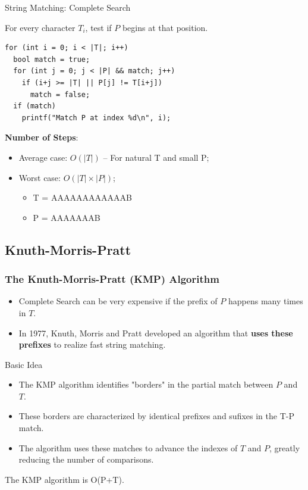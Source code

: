 \begin{frame}[fragile]{String Matching: Complete Search}

  For every character $T_i$, test if $P$ begins at that position.\bigskip

\begin{verbatim}
for (int i = 0; i < |T|; i++)
  bool match = true;
  for (int j = 0; j < |P| && match; j++)
    if (i+j >= |T| || P[j] != T[i+j])
      match = false;
  if (match)
    printf("Match P at index %d\n", i);
\end{verbatim}

{\bf Number of Steps}:
  \begin{itemize}
    \item Average case: $O(|T|)$ -- For natural T and small P;
    \item Worst case: $O(|T|\times|P|)$;
    \begin{itemize}
      \item T = AAAAAAAAAAAAB
      \item P = AAAAAAAB
    \end{itemize}
  \end{itemize}
\end{frame}

\subsection{Knuth-Morris-Pratt}
\begin{frame}[fragile]
  \frametitle{The Knuth-Morris-Pratt (KMP) Algorithm}

  \begin{itemize}
    \item Complete Search can be very expensive if the prefix of $P$ happens many times in $T$.
    \item In 1977, Knuth, Morris and Pratt developed an algorithm that {\bf uses these prefixes} to realize fast string matching.
  \end{itemize}

  \begin{block}{Basic Idea}
    \begin{itemize}
    \item The KMP algorithm identifies "borders" in the partial match between $P$ and $T$.
    \item These borders are characterized by identical prefixes and sufixes in the T-P match.
    \item The algorithm uses these matches to advance the indexes of $T$ and $P$, greatly reducing the number of comparisons.
  \end{itemize}
  \end{block}
  The KMP algorithm is O(P+T).
\end{frame}

